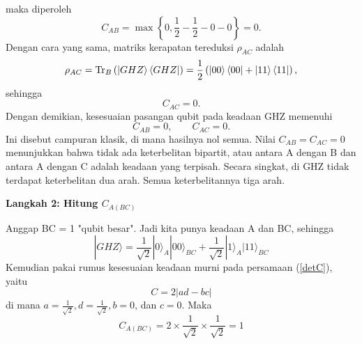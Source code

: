 maka diperoleh
\begin{equation}
	C_{AB}
	=
	\max
	\left\{
	0,
	\frac{1}{2}-\frac{1}{2}-0-0
	\right\}
	=
	0.
\end{equation}
Dengan cara yang sama, matriks kerapatan tereduksi $\rho_{AC}$ adalah
\begin{equation}
	\rho_{AC}
	=
	\mathrm{Tr}_B
	\left(
	\ket{GHZ}\bra{GHZ}
	\right)
	=
	\frac{1}{2}
	\left(
	\ket{00}\bra{00}
	+
	\ket{11}\bra{11}
	\right),
\end{equation}
sehingga
\begin{equation}
	C_{AC}
	=
	0.
\end{equation}
Dengan demikian, kesesuaian pasangan qubit pada keadaan GHZ memenuhi
\begin{equation}
	C_{AB}=0,
	\qquad
	C_{AC}=0.
\end{equation}
Ini disebut campuran klasik, di mana hasilnya nol semua. Nilai $C_{AB}=C_{AC}=0$ menunjukkan bahwa tidak ada keterbelitan bipartit, atau antara A dengan B dan antara A dengan C adalah keadaan yang terpisah. Secara singkat, di GHZ tidak terdapat keterbelitan dua arah. Semua keterbelitannya tiga arah.

\textbf{Langkah 2: Hitung $C_{A(BC)}$}

Anggap BC = 1 "qubit besar". Jadi kita punya keadaan A dan BC, sehingga
\begin{equation*}
	|GHZ\rangle = \frac{1}{\sqrt{2}}|0\rangle_A|00\rangle_{BC} + \frac{1}{\sqrt{2}}|1\rangle_A|11\rangle_{BC}
\end{equation*}
Kemudian pakai rumus kesesuaian keadaan murni pada persamaan (\ref{detC}), yaitu
\begin{equation*}
	C = 2|ad - bc|
\end{equation*}
di mana $a = \frac{1}{\sqrt{2}}, d = \frac{1}{\sqrt{2}}, b = 0$, dan $c = 0$.
Maka
\begin{equation}
	C_{A(BC)} = 2 \times \frac{1}{\sqrt{2}} \times \frac{1}{\sqrt{2}} = 1
\end{equation}

